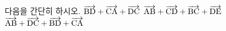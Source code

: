 다음을 간단히 하시오.
 $\overrightarrow{\mathrm{BD}}+\overrightarrow{\mathrm{CA}}+\overrightarrow{\mathrm{DC}}$
 $\overrightarrow{\mathrm{AB}}+\overrightarrow{\mathrm{CD}}+\overrightarrow{\mathrm{BC}}+\overrightarrow{\mathrm{DE}}$
 $\overrightarrow{\mathrm{AB}}+\overrightarrow{\mathrm{DC}}+\overrightarrow{\mathrm{BD}}+\overrightarrow{\mathrm{CA}}$
